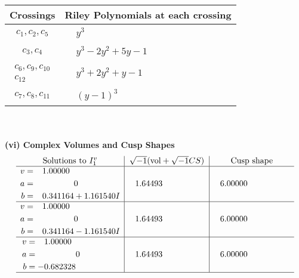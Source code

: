 \documentclass[1p]{elsarticle_modified}
\theoremstyle{definition}
\newcommand{\I}{\sqrt{-1}}
\begin{document}
\begin{tabular}{m{50pt}|m{274pt}}
Crossings & \hspace{64pt}Riley Polynomials at each crossing \\
\hline $$\begin{aligned}c_{1},c_{2},c_{5}\end{aligned}$$&$\begin{aligned}
&y^3
\end{aligned}$\\
\hline $$\begin{aligned}c_{3},c_{4}\end{aligned}$$&$\begin{aligned}
&y^3-2 y^2+5 y-1
\end{aligned}$\\
\hline $$\begin{aligned}c_{6},c_{9},c_{10}\\c_{12}\end{aligned}$$&$\begin{aligned}
&y^3+2 y^2+y-1
\end{aligned}$\\
\hline $$\begin{aligned}c_{7},c_{8},c_{11}\end{aligned}$$&$\begin{aligned}
&(y-1)^3
\end{aligned}$\\
\hline
\end{tabular}\\~\\
\newpage\flushleft \textbf{(vi) Complex Volumes and Cusp Shapes}
$$\begin{array}{c|c|c}  
\text{Solutions to }I^v_{1}& \I (\text{vol} + \sqrt{-1}CS) & \text{Cusp shape}\\
 \hline 
\begin{aligned}
v &= \phantom{-}1.00000\phantom{ +0.000000I} \\
a &= \phantom{-0.000000 } 0 \\
b &= \phantom{-}0.341164 + 1.161540 I\end{aligned}
 & \phantom{-}1.64493\phantom{ +0.000000I} & \phantom{-}6.00000\phantom{ +0.000000I} \\ \hline\begin{aligned}
v &= \phantom{-}1.00000\phantom{ +0.000000I} \\
a &= \phantom{-0.000000 } 0 \\
b &= \phantom{-}0.341164 - 1.161540 I\end{aligned}
 & \phantom{-}1.64493\phantom{ +0.000000I} & \phantom{-}6.00000\phantom{ +0.000000I} \\ \hline\begin{aligned}
v &= \phantom{-}1.00000\phantom{ +0.000000I} \\
a &= \phantom{-0.000000 } 0 \\
b &= -0.682328\phantom{ +0.000000I}\end{aligned}
 & \phantom{-}1.64493\phantom{ +0.000000I} & \phantom{-}6.00000\phantom{ +0.000000I}\\
 \hline 
 \end{array}$$\newpage
\end{document}
